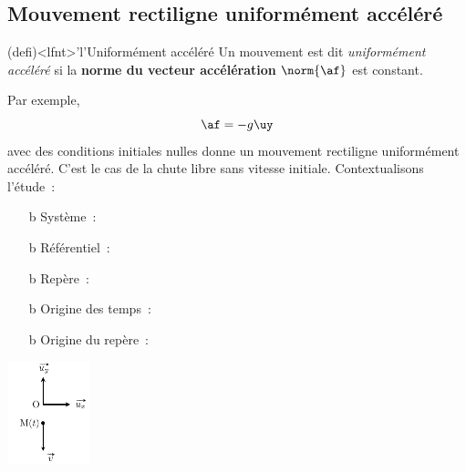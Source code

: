 \documentclass[../../main/main.tex]{subfiles}
\begin{document}
\subsection{Mouvement rectiligne uniformément accéléré}
\begin{tcb}(defi)<lfnt>'l'{Uniformément accéléré}
	Un mouvement est dit \textit{uniformément accéléré} si la \textbf{norme du
		vecteur accélération} $\norm{\af}$ est constant.
\end{tcb}
Par exemple,
\[\af = -g\uy\]
avec des conditions initiales nulles donne un mouvement rectiligne uniformément
accéléré. C'est le cas de la chute libre sans vitesse initiale. Contextualisons
l'étude~:
\smallbreak
\noindent
\begin{minipage}{0.80\linewidth}
	\begin{itemize}
		\item[b]{Système}~: 
		\item[b]{Référentiel}~: 
		\item[b]{Repère}~: 
		\item[b]{Origine des temps}~:
		\item[b]{Origine du repère}~:
	\end{itemize}
\end{minipage}
\hfill
\begin{minipage}{0.19\linewidth}
	\begin{center}
		\includegraphics[height=3cm]{nov_init}
	\end{center}
\end{minipage}
\end{document}
